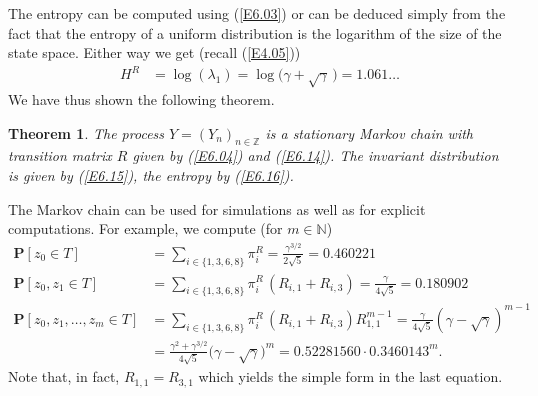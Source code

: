 \documentclass[11pt]{article}
\providecommand{\1}{\mathBB{1}}
\renewcommand{\P}{\mathbf{P}}
\newcommand{\N}{{\mathbb{N}}}
\newcommand{\Z}{{\mathbb{Z}}}
\newcommand{\equ}[1]{(\ref{#1})}
\newtheorem{theorem}[proposition]{Theorem}
\begin{document}
The entropy can be computed using \equ{E6.03} or can be deduced simply from the fact that the entropy of a uniform distribution is the logarithm of the size of the state space. Either way we get (recall \equ{E4.05})
\begin{equation}
\label{E6.16}
\begin{aligned}
H^R&=\log(\lambda_1)=\log\big(\gamma+\sqrt{\gamma}\,\big)
=1.061\ldots
\end{aligned}
\end{equation}
We have thus shown the following theorem.
\begin{theorem}
\label{T5}
The process $Y=(Y_n)_{n\in\Z}$ is a stationary Markov chain with transition matrix $R$ given by \equ{E6.04} and \equ{E6.14}. The invariant distribution is given by \equ{E6.15}, the entropy by \equ{E6.16}.
\end{theorem}
The Markov chain can be used for simulations as well as for explicit computations. For example, we compute (for $m\in\N$)
\begin{equation}
\label{E6.17}
\begin{aligned}
\P[z_0\in T]
&=\sum_{i\in\{1,3,6,8\}}\pi^R_i=\frac{\gamma^{3/2}}{2\sqrt{5}}=0.460221\\
\P[z_0,z_1\in T]
&=\sum_{i\in\{1,3,6,8\}}\pi^R_i\,(R_{i,1}+R_{i,3})=\frac{\gamma}{4\sqrt{5}}=0.180902\\
\P[z_0,z_1,\ldots,z_m\in T]
&=\sum_{i\in\{1,3,6,8\}}\pi^R_i\,(R_{i,1}+R_{i,3})R_{1,1}^{m-1}
=\frac{\gamma}{4\sqrt{5}}(\gamma-\sqrt{\gamma})^{m-1}\\
&=\frac{\gamma^2+\gamma^{3/2}}{4\sqrt{5}}\big(\gamma-\sqrt{\gamma}\big)^{m}
=0.52281560\cdot0.3460143^m.
\end{aligned}
\end{equation}
Note that, in fact, $R_{1,1}=R_{3,1}$ which yields the simple form in the last equation.
\end{document}
